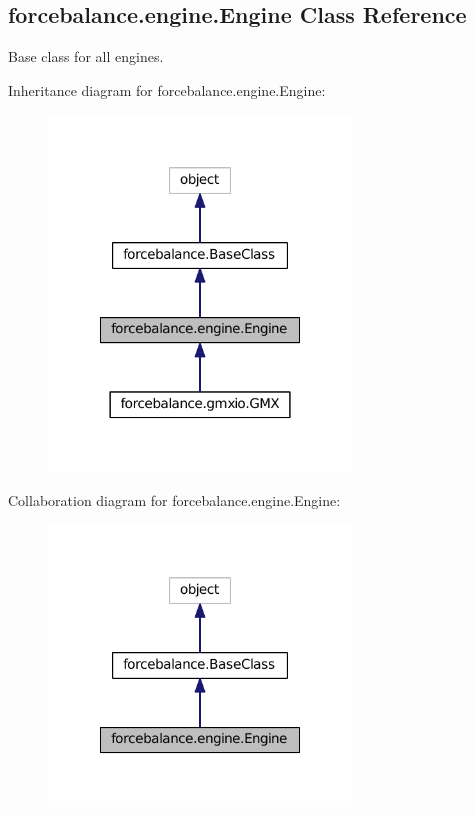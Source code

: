 \hypertarget{classforcebalance_1_1engine_1_1Engine}{\subsection{forcebalance.\-engine.\-Engine Class Reference}
\label{classforcebalance_1_1engine_1_1Engine}
}


Base class for all engines.  




Inheritance diagram for forcebalance.\-engine.\-Engine\-:
\nopagebreak
\begin{figure}[H]
\begin{center}
\leavevmode
\includegraphics[width=228pt]{classforcebalance_1_1engine_1_1Engine__inherit__graph}
\end{center}
\end{figure}


Collaboration diagram for forcebalance.\-engine.\-Engine\-:
\nopagebreak
\begin{figure}[H]
\begin{center}
\leavevmode
\includegraphics[width=228pt]{classforcebalance_1_1engine_1_1Engine__coll__graph}
\end{center}
\end{figure}
